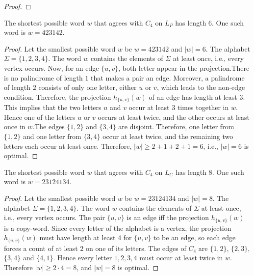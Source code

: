 \documentclass[runningheads]{llncs}
\begin{document}
\begin{proof}
    
\end{proof}

\begin{proposition}
The shortest possible word $w$ that agrees with $C_4$ on $L_{P}$ has length $6$. One such word is $w = 423142$.
\end{proposition}

\begin{proof}
Let the smallest possible word $w$ be $w = 423142 $ and $|w| = 6$. The alphabet $\Sigma = \{1,2,3,4\}.$ The word $w$ contains the elements of $\Sigma$ at least once, i.e., every vertex occurs. Now, for an edge  $\{u,v\}$, both letter appear in the projection.There is no palindrome of length $1$ that makes a pair an edge. Moreover, a palindrome of length $2$ consists of only one letter, either $u$ or $v$, which leads to the non-edge condition. Therefore, the projection $h_{\{u,v\}}(w)$ of an edge has length at least $3$. This implies that the two letters $u$ and $v$ occur at least $3$ times together in $w$. Hence one of the letters $u$ or $v$ occurs at least twice, and the other occurs at least once in $w$.The edges $\{1,2\}$ and $\{3,4\}$ are disjoint. Therefore, one letter from $\{1,2\}$ and one letter from $\{3,4\}$ occur at least twice, and the remaining two letters  each occur at least once. Therefore, $|w| \geq 2+1+2+1 = 6$, i.e., $|w| = 6$ is optimal.
\end{proof}
\begin{proposition}
    The shortest possible word $w$ that agrees with $C_4$ on $L_{C}$ has length $8$. One such word is $w = 23124134$.
\end{proposition}
\begin{proof}
    Let the smallest possible word $w$ be $w = 23124134 $ and $|w| = 8$. The alphabet $\Sigma = \{1,2,3,4\}.$ The word $w$ contains the elements of $\Sigma$ at least once, i.e., every vertex occurs. The pair  $\{u,v\}$ is an edge iff the projection $h_{\{u,v\}}(w)$ is a copy-word. Since every letter of the alphabet is a vertex, the projection $h_{\{u,v\}}(w)$ must have length at least $4$ for $\{u,v\}$ to be an edge, so each edge forces a count of at least $2$ on one of its letters. The edges of $C_4$ are $\{1,2\}$, $\{2,3\}$, $\{3,4\}$ and $\{4,1\}$. Hence every letter $1,2,3,4$ must occur at least twice in $w$. Therefore $|w| \geq 2 \cdot 4 = 8$, and $|w| = 8$ is optimal.
\end{proof}
\end{document}

